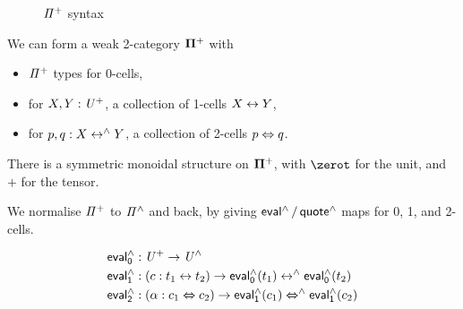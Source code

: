 \begin{figure}[t]
  {}

  {}
  \caption{$\mathit{{\Pi}^{+}}$ syntax}
  \label{fig:piplus}
\end{figure}

\begin{proposition}
  We can form a weak 2-category $\mathbf{\Pi^{+}}$ with
  \begin{itemize}
    \item $\mathit{{\Pi}^{+}}$ types for 0-cells,
    \item for $X, Y : \mathit{U}^{+}$, a collection of 1-cells $X \mathrel{\leftrightarrow} Y$,
    \item for $p, q : X \mathrel{\leftrightarrow^{\wedge}} Y$, a collection of 2-cells $p \mathrel{\Leftrightarrow} q$.
  \end{itemize}
\end{proposition}

\begin{proposition}
  There is a symmetric monoidal structure on $\mathbf{\Pi^{+}}$, with $\zerot$ for the unit, and $+$ for the tensor.
\end{proposition}

We normalise $\mathit{{\Pi}^{+}}$ to $\mathit{{\Pi}^{\wedge}}$ and back, by giving $\evalh/\quoteh$ maps for 0, 1, and 2-cells.

\begin{definition}
  \begin{align*}
    \evalh_{0} & : \UPlus \to \UHat                                                          \\
    \evalh_{1} & : (c : t_{1} \iso t_{2}) \to \evalh_{0}(t_{1}) \isoh \evalh_{0}(t_{2})      \\
    \evalh_{2} & : (\alpha : c_{1} \Iso c_{2}) \to \evalh_{1}(c_{1}) \Isoh \evalh_{1}(c_{2}) \\
  \end{align*}
\end{definition}

